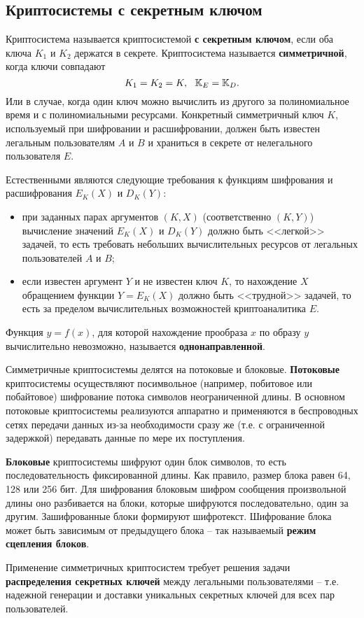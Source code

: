 \subsection{Криптосистемы с секретным ключом}

Криптосистема называется криптосистемой \textbf{с секретным ключом}, если оба ключа $K_1$ и $K_2$ держатся в секрете.
Криптосистема называется \textbf{симметричной}, когда ключи совпадают
    \[ K_1 = K_2 = K, ~~ \mathbb{K}_E = \mathbb{K}_D. \]
    Или в случае, когда один ключ можно вычислить из другого за полиномиальное время и с полиномиальными ресурсами.
Конкретный симметричный ключ $K$, используемый при шифровании и расшифровании, должен быть известен легальным пользователям $A$ и $B$ и храниться в секрете от нелегального пользователя $E$.

Естественными являются следующие требования к функциям шифрования и расшифрования  $E_K(X)$ и $D_K(Y)$:
\begin{itemize}
  \item при заданных парах аргументов $(K,X)$ (соответственно $(K,Y)$) вычисление значений $E_K(X)$ и $D_K(Y)$ должно быть <<легкой>> задачей, то есть требовать небольших вычислительных ресурсов от легальных пользователей $A$ и $B$;
  \item если известен аргумент $Y$ и не известен ключ $K$, то нахождение $X$ обращением функции $Y = E_K(X)$
      должно быть <<трудной>> задачей, то есть за пределом вычислительных возможностей криптоаналитика $E$.
\end{itemize}

Функция $y = f(x)$, для которой нахождение прообраза $x$ по образу $y$ вычислительно невозможно, называется \textbf{однонаправленной}.

Симметричные криптосистемы делятся на потоковые и блоковые. \textbf{Потоковые} криптосистемы осуществляют посимвольное (например, побитовое или побайтовое) шифрование потока символов неограниченной длины. В основном потоковые криптосистемы реализуются аппаратно и применяются в беспроводных сетях передачи данных из-за необходимости сразу же (т.е. с ограниченной задержкой) передавать данные по мере их поступления.

\textbf{Блоковые} криптосистемы шифруют один блок символов, то есть последовательность фиксированной длины. Как правило, размер блока равен 64, 128 или 256 бит. Для шифрования блоковым шифром сообщения произвольной длины оно разбивается на блоки, которые шифруются последовательно, один за другим. Зашифрованные блоки формируют шифротекст. Шифрование блока может быть зависимым от предыдущего блока -- так называемый \textbf{режим сцепления блоков}.

Применение симметричных криптосистем требует решения задачи \textbf{распределения секретных ключей} между легальными пользователями -- т.е. надежной генерации и доставки уникальных секретных ключей для всех пар пользователей.
